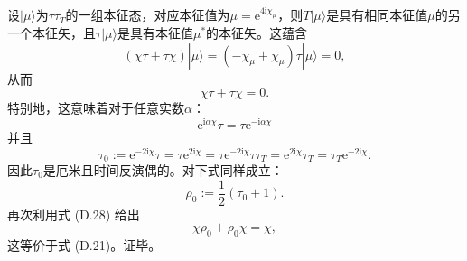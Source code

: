 设$|\mu\rangle$为$\tau\tau_{T}$的一组本征态，对应本征值为$\mu=\mathrm{e}^{4\mathrm{i}\chi_{\mu}}$，则$T|\mu\rangle$是具有相同本征值$\mu$的另一个本征矢，且$\tau|\mu\rangle$是具有本征值$\mu^{*}$的本征矢。这蕴含
\begin{equation}
(\chi\tau+\tau\chi)|\mu\rangle=(-\chi_{\mu}+\chi_{\mu})\tau|\mu\rangle=0,\label{eq:appendix_d_chi_tau_action}
\end{equation}
从而
\begin{equation}
\chi\tau+\tau\chi=0.\label{eq:appendix_d_chi_tau_anticomm}
\end{equation}
特别地，这意味着对于任意实数$\alpha$：
\begin{equation}
\mathrm{e}^{\mathrm{i}\alpha\chi}\tau=\tau\mathrm{e}^{-\mathrm{i}\alpha\chi}\label{eq:appendix_d_exp_comm}
\end{equation}
并且
\begin{equation}
\tau_{0}:=\mathrm{e}^{-2\mathrm{i}\chi}\tau=\tau\mathrm{e}^{2\mathrm{i}\chi}=\tau\mathrm{e}^{-2\mathrm{i}\chi}\tau\tau_{T}=\mathrm{e}^{2\mathrm{i}\chi}\tau_{T}=\tau_{T}\mathrm{e}^{-2\mathrm{i}\chi}.\label{eq:appendix_d_tau0_def}
\end{equation}
因此$\tau_{0}$是厄米且时间反演偶的。对下式同样成立：
\begin{equation}
\rho_{0}:=\frac{1}{2}(\tau_{0}+1).\label{eq:appendix_d_rho0_def}
\end{equation}
再次利用式 (D.28) 给出
\begin{equation}
\chi\rho_{0}+\rho_{0}\chi=\chi,\label{eq:appendix_d_chi_rho0}
\end{equation}
这等价于式 (D.21)。证毕。

